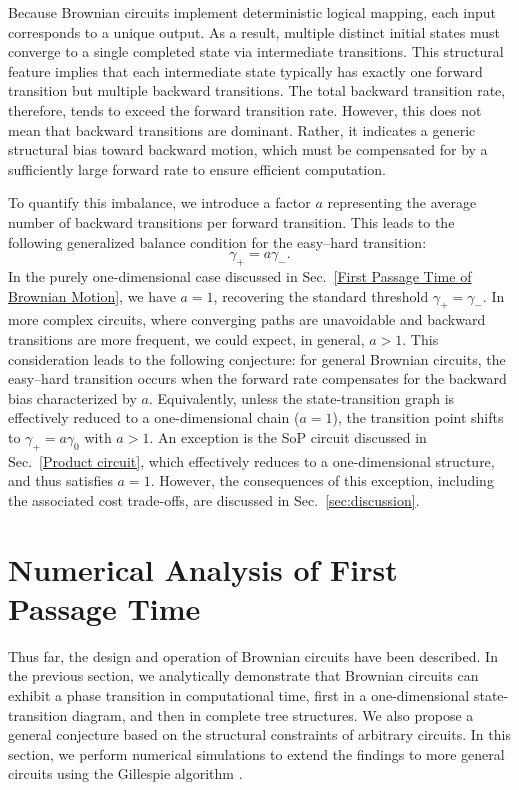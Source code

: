 \documentclass[%
 reprint,
superscriptaddress,
 amsmath,amssymb,
 aps,
 prx,
]{revtex4-2}
\begin{document}
Because Brownian circuits implement deterministic logical mapping, each input corresponds to a unique output. As a result, multiple distinct initial states must converge to a single completed state via intermediate transitions. This structural feature implies that each intermediate state typically has exactly one forward transition but multiple backward transitions. The total backward transition rate, therefore, tends to exceed the forward transition rate. However, this does not mean that backward transitions are dominant. Rather, it indicates a generic structural bias toward backward motion, which must be compensated for by a sufficiently large forward rate to ensure efficient computation. 

To quantify this imbalance, we introduce a factor $a$ representing the average number of backward transitions per forward transition. This leads to the following generalized balance condition for the easy--hard transition:  
\begin{equation}
    \gamma_+ = a\gamma_-. 
\end{equation}
In the purely one-dimensional case discussed in Sec.~\ref{First Passage Time of Brownian Motion}, we have $a=1$, recovering the standard threshold $\gamma_+=\gamma_-$. In more complex circuits, where converging paths are unavoidable and backward transitions are more frequent, we could expect, in general, $a>1$. 
This consideration leads to the following conjecture: for general Brownian circuits, the easy--hard transition occurs when the forward rate compensates for the backward bias characterized by $a$. Equivalently, unless the state-transition graph is effectively reduced to a one-dimensional chain ($a=1$), the transition point shifts to $\gamma_+=a\gamma_0$ with $a>1$.    
An exception is the SoP circuit discussed in Sec.~\ref{Product circuit}, which effectively reduces to a one-dimensional structure, and thus satisfies $a=1$. However, the consequences of this exception, including the associated cost trade-offs, are discussed in Sec.~\ref{sec:discussion}.  
 
\section{Numerical Analysis of First Passage Time}\label{Numerical Analysis}
Thus far, the design and operation of Brownian circuits have been described. In the previous section, we analytically demonstrate that Brownian circuits can exhibit a phase transition in computational time, first in a one-dimensional state-transition diagram, and then in complete tree structures. We also propose a general conjecture based on the structural constraints of arbitrary circuits. In this section, we perform numerical simulations to extend the findings to more general circuits using the Gillespie algorithm \cite{gillespie_general_1976}.
\end{document}
